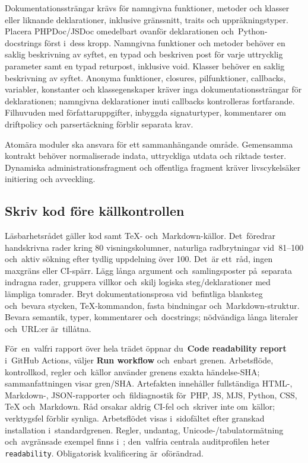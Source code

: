 \documentclass[11pt,a4paper]{article}
\newcommand{\filepath}[1]{\path{#1}}
\newcommand{\ui}[1]{\textbf{#1}}
\newcommand{\codeword}[1]{\nolinkurl{#1}}
\begin{document}
Dokumentationssträngar krävs för namngivna funktioner, metoder och klasser eller
liknande deklarationer, inklusive gränssnitt, traits och uppräkningstyper.
Placera PHPDoc/JSDoc omedelbart ovanför deklarationen och~Python-docstrings
först i~dess kropp. Namngivna funktioner och metoder behöver en saklig
beskrivning av syftet, en typad och beskriven post för varje uttrycklig
parameter samt en typad returpost, inklusive void. Klasser behöver en saklig
beskrivning av syftet. Anonyma funktioner, closures, pilfunktioner, callbacks,
variabler, konstanter och klassegenskaper kräver inga dokumentationssträngar för
deklarationen; namngivna deklarationer inuti callbacks kontrolleras fortfarande.
Filhuvuden med författaruppgifter, inbyggda signaturtyper, kommentarer om
driftpolicy och parsertäckning förblir separata krav.

Atomära moduler ska ansvara för ett sammanhängande område. Gemensamma kontrakt
behöver normaliserade indata, uttryckliga utdata och riktade tester. Dynamiska
administrationsfragment och offentliga fragment kräver livscykelsäker initiering
och avveckling.

\subsection{Skriv kod före källkontrollen}

Läsbarhetsrådet gäller kod samt TeX- och~Markdown-källor. Det~föredrar
handskrivna rader kring 80 visningskolumner, naturliga radbrytningar vid~81--100
och~aktiv sökning efter tydlig uppdelning över 100. Det~är ett~råd, ingen
maxgräns eller CI-spärr. Lägg långa argument och~samlingsposter på~separata
indragna rader, gruppera villkor och~skilj logiska steg/deklarationer med
lämpliga tomrader. Bryt dokumentationsprosa vid~befintliga blanksteg och~bevara
stycken, TeX-kommandon, fasta bindningar och~Markdown-struktur. Bevara semantik,
typer, kommentarer och~docstrings; nödvändiga långa literaler och~URL:er
är~tillåtna.

För~en~valfri rapport över hela trädet öppnar du~\ui{Code readability report}
i~GitHub Actions, väljer \ui{Run workflow} och~enbart grenen. Arbetsflöde,
kontrollkod, regler och~källor använder grenens exakta händelse-SHA;
sammanfattningen visar gren/SHA. Artefakten innehåller fullständiga HTML-,
Markdown-, JSON-rapporter och~fildiagnostik för~PHP, JS, MJS, Python, CSS,
TeX och~Markdown. Råd orsakar aldrig CI-fel och~skriver inte om~källor;
verktygsfel förblir synliga. Arbetsflödet visas i~sidofältet efter granskad
installation i~standardgrenen. Regler, undantag, Unicode-/tabulatormätning
och~avgränsade exempel finns i~\filepath{docs/CODE_READABILITY.md};
den~valfria centrala auditprofilen heter \codeword{readability}.
Obligatorisk kvalificering är~oförändrad.
\end{document}
